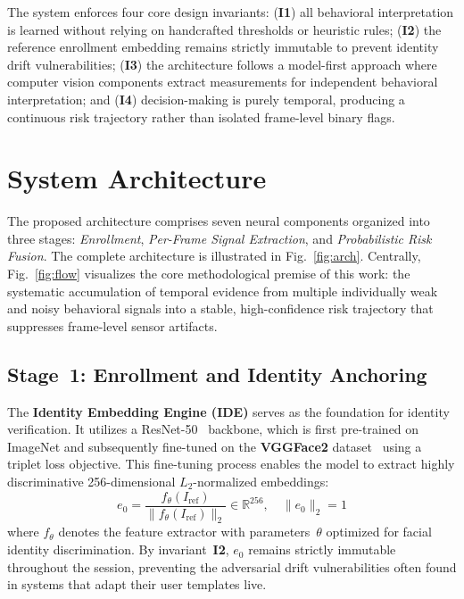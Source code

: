 \documentclass[journal]{IEEEtran}
\begin{document}
\noindent The system enforces four core design invariants: (\textbf{I1}) all behavioral interpretation is learned without relying on handcrafted thresholds or heuristic rules; (\textbf{I2}) the reference enrollment embedding remains strictly immutable to prevent identity drift vulnerabilities; (\textbf{I3}) the architecture follows a model-first approach where computer vision components extract measurements for independent behavioral interpretation; and (\textbf{I4}) decision-making is purely temporal, producing a continuous risk trajectory rather than isolated frame-level binary flags.


\section{System Architecture}
\label{sec:methodology}

The proposed architecture comprises seven neural components organized into three stages: \emph{Enrollment}, \emph{Per-Frame Signal Extraction}, and \emph{Probabilistic Risk Fusion}. The complete architecture is illustrated in Fig.~\ref{fig:arch}. Centrally, Fig.~\ref{fig:flow} visualizes the core methodological premise of this work: the systematic accumulation of temporal evidence from multiple individually weak and noisy behavioral signals into a stable, high-confidence risk trajectory that suppresses frame-level sensor artifacts.

\subsection{Stage~1: Enrollment and Identity Anchoring}

The \textbf{Identity Embedding Engine (IDE)} serves as the foundation for identity verification. It utilizes a ResNet-50~\cite{He2016} backbone, which is first pre-trained on ImageNet and subsequently fine-tuned on the \textbf{VGGFace2} dataset~\cite{Cao2018} using a triplet loss objective. This fine-tuning process enables the model to extract highly discriminative 256-dimensional $L_2$-normalized embeddings:
\begin{equation}
    e_0 = \frac{f_\theta(I_{\mathrm{ref}})}{\lVert f_\theta(I_{\mathrm{ref}}) \rVert_2} \in \mathbb{R}^{256}, \quad \lVert e_0 \rVert_2 = 1
    \label{eq:ide}
\end{equation}
where $f_\theta$ denotes the feature extractor with parameters~$\theta$ optimized for facial identity discrimination. By invariant~\textbf{I2}, $e_0$ remains strictly immutable throughout the session, preventing the adversarial drift vulnerabilities often found in systems that adapt their user templates live.
\end{document}
